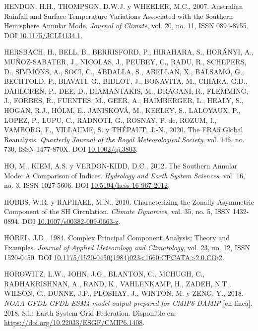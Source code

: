 \documentclass[12pt,oneside,a4paper]{reedthesis}
\newlength{\cslhangindent}
\newenvironment{CSLReferences}[2] %
 {%
  \setlength{\parindent}{0pt}
  \ifodd #1 \everypar{\setlength{\hangindent}{\cslhangindent}}\ignorespaces\fi
  \ifnum #2 > 0
  \setlength{\parskip}{#2\baselineskip}
  \fi
 }%
 {}
\begin{document}
\begin{CSLReferences}{1}{0}
\leavevmode{}%
HENDON, H.H., THOMPSON, D.W.J. y WHEELER, M.C., 2007. Australian {Rainfall} and {Surface Temperature Variations Associated} with the {Southern Hemisphere Annular Mode}. \emph{Journal of Climate}, vol. 20, no. 11, ISSN 0894-8755. DOI \href{https://doi.org/10.1175/JCLI4134.1}{10.1175/JCLI4134.1}.

\leavevmode{}%
HERSBACH, H., BELL, B., BERRISFORD, P., HIRAHARA, S., HORÁNYI, A., MUÑOZ-SABATER, J., NICOLAS, J., PEUBEY, C., RADU, R., SCHEPERS, D., SIMMONS, A., SOCI, C., ABDALLA, S., ABELLAN, X., BALSAMO, G., BECHTOLD, P., BIAVATI, G., BIDLOT, J., BONAVITA, M., CHIARA, G.D., DAHLGREN, P., DEE, D., DIAMANTAKIS, M., DRAGANI, R., FLEMMING, J., FORBES, R., FUENTES, M., GEER, A., HAIMBERGER, L., HEALY, S., HOGAN, R.J., HÓLM, E., JANISKOVÁ, M., KEELEY, S., LALOYAUX, P., LOPEZ, P., LUPU, C., RADNOTI, G., ROSNAY, P. de, ROZUM, I., VAMBORG, F., VILLAUME, S. y THÉPAUT, J.-N., 2020. The {ERA5} Global Reanalysis. \emph{Quarterly Journal of the Royal Meteorological Society}, vol. 146, no. 730, ISSN 1477-870X. DOI \href{https://doi.org/10.1002/qj.3803}{10.1002/qj.3803}.

\leavevmode{}%
HO, M., KIEM, A.S. y VERDON-KIDD, D.C., 2012. The {Southern Annular Mode}: A Comparison of Indices. \emph{Hydrology and Earth System Sciences}, vol. 16, no. 3, ISSN 1027-5606. DOI \href{https://doi.org/10.5194/hess-16-967-2012}{10.5194/hess-16-967-2012}.

\leavevmode{}%
HOBBS, W.R. y RAPHAEL, M.N., 2010. Characterizing the Zonally Asymmetric Component of the {SH} Circulation. \emph{Climate Dynamics}, vol. 35, no. 5, ISSN 1432-0894. DOI \href{https://doi.org/10.1007/s00382-009-0663-z}{10.1007/s00382-009-0663-z}.

\leavevmode{}%
HOREL, J.D., 1984. Complex {Principal Component Analysis}: {Theory} and {Examples}. \emph{Journal of Applied Meteorology and Climatology}, vol. 23, no. 12, ISSN 1520-0450. DOI \href{https://doi.org/10.1175/1520-0450(1984)023\%3C1660:CPCATA\%3E2.0.CO;2}{10.1175/1520-0450(1984)023\textless1660:CPCATA\textgreater2.0.CO;2}.

\leavevmode{}%
HOROWITZ, L.W., JOHN, J.G., BLANTON, C., MCHUGH, C., RADHAKRISHNAN, A., RAND, K., VAHLENKAMP, H., ZADEH, N.T., WILSON, C., DUNNE, J.P., PLOSHAY, J., WINTON, M. y ZENG, Y., 2018. \emph{NOAA-GFDL GFDL-ESM4 model output prepared for CMIP6 DAMIP} {[}en línea{]}. 2018. S.l.: Earth System Grid Federation. Disponible en: \url{https://doi.org/10.22033/ESGF/CMIP6.1408}.


\end{CSLReferences}
\end{document}
